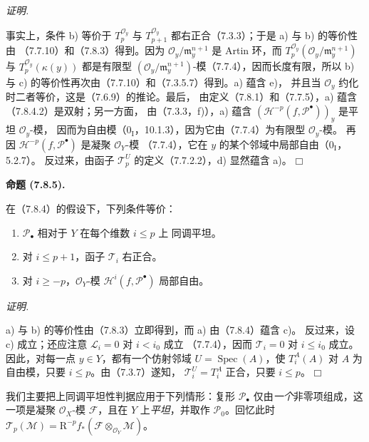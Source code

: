 \documentclass[UTF8,fontset=none,11pt,oneside,openany]{ctexbook}
\providecommand{\square}{\mdlgwhtsquare}
\newenvironment{proposition}[1][]{%
  \par\medskip\noindent\textbf{命题 (#1).}\ %
}{\par}
\newenvironment{proof}{%
  \par\smallskip\noindent\textit{证明.}\ %
}{\hfill$\square$\par}
\newcommand{\oldpage}[2][]{%
  \hypertarget{ega-source-page-#1-#2}{}%
  \marginnote{\scriptsize\textbf{#1}~|~#2}\ignorespaces}
\begin{document}
\oldpage[III]{206}
\begin{proof}
事实上，条件 b) 等价于 $T_p^{\mathscr O_y}$ 与
$T_{p+1}^{\mathscr O_y}$ 都右正合（7.3.3）；于是 a) 与 b) 的等价性由
（7.7.10）和（7.8.3）得到。因为 $\mathscr O_y/\mathfrak m_y^{n+1}$
是 Artin 环，而
$T_p^{\mathscr O_y}(\mathscr O_y/\mathfrak m_y^{n+1})$ 与
$T_p^{\mathscr O_y}(\kappa(y))$ 都是有限型
$(\mathscr O_y/\mathfrak m_y^{n+1})$-模（7.7.4），因而长度有限，所以
b) 与 c) 的等价性再次由（7.7.10）和（7.3.5.7）得到。a) 蕴含 e)，
并且当 $\mathscr O_y$ 约化时二者等价，这是（7.6.9）的推论。最后，
由定义（7.8.1）和（7.7.5），a) 蕴含（7.8.4.2）是双射；另一方面，
由（7.3.3，f)），a) 蕴含
$(\mathscr H^{-p}(f,\mathscr P^\bullet))_y$ 是平坦 $\mathscr O_y$-模，
因而为自由模（$0_{\mathrm I}$，10.1.3），因为它由（7.7.4）为有限型
$\mathscr O_y$-模。
再因 $\mathscr H^{-p}(f,\mathscr P^\bullet)$ 是凝聚 $\mathscr O_Y$-模
（7.7.4），它在 $y$ 的某个邻域中局部自由（$0_{\mathrm I}$，5.2.7）。
反过来，由函子 $\mathscr T_p^U$ 的定义（7.7.2.2），d) 显然蕴含 a)。
\end{proof}

\begin{proposition}[7.8.5]
在（7.8.4）的假设下，下列条件等价：
\begin{enumerate}
  \item[a)] $\mathscr P_\bullet$ 相对于 $Y$ 在每个维数 $i\leq p$ 上
    同调平坦。
  \item[b)] 对 $i\leq p+1$，函子 $\mathscr T_i$ 右正合。
  \item[c)] 对 $i\geq-p$，$\mathscr O_Y$-模
    $\mathscr H^i(f,\mathscr P^\bullet)$ 局部自由。
\end{enumerate}
\end{proposition}

\begin{proof}
a) 与 b) 的等价性由（7.8.3）立即得到，而 a) 由（7.8.4）蕴含 c)。
反过来，设 c) 成立；还应注意 $\mathscr L_i=0$ 对 $i<i_0$ 成立
（7.7.4），因而 $\mathscr T_i=0$ 对 $i\leq i_0$ 成立。因此，对每一点
$y\in Y$，都有一个仿射邻域 $U=\operatorname{Spec}(A)$，使
$T_i^A(A)$ 对 $A$ 为自由模，只要 $i\leq p$。由（7.3.7）遂知，
$\mathscr T_i^U=T_i^A$ 正合，只要 $i\leq p$。
\end{proof}

我们主要把上同调平坦性判据应用于下列情形：复形
$\mathscr P_\bullet$ 仅由\emph{一个}非零项组成，这一项是凝聚
$\mathscr O_X$-模 $\mathscr F$，且在 $Y$ 上\emph{平坦}，并取作
$\mathscr P_0$。回忆此时
$\mathscr T_p(\mathscr M)=\mathrm R^{-p}f_*
(\mathscr F\otimes_{\mathscr O_Y}\mathscr M)$。
\end{document}
